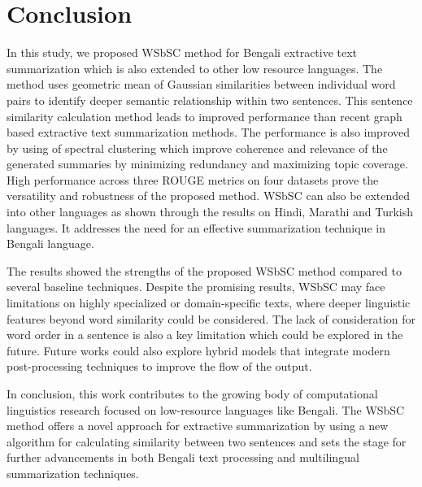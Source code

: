 \documentclass[acmlarge]{acmart}
\begin{document}
\section{Conclusion}\label{sec:conclusion}
In this study, we proposed WSbSC method for Bengali extractive text summarization which is also extended to other low resource languages. The method uses geometric mean of Gaussian similarities between individual word pairs to identify deeper semantic relationship within two sentences. This sentence similarity calculation method leads to improved performance than recent graph based extractive text summarization methods. The performance is also improved by using of spectral clustering which improve coherence and relevance of the generated summaries by minimizing redundancy and maximizing topic coverage. High performance across three ROUGE metrics on four datasets prove the versatility and robustness of the proposed method. WSbSC can also be extended into other languages as shown through the results on Hindi, Marathi and Turkish languages. 
It addresses the need for an effective summarization technique in Bengali language.

The results showed the strengths of the proposed WSbSC method compared to several baseline techniques. Despite the promising results, WSbSC may face limitations on highly specialized or domain-specific texts, where deeper linguistic features beyond word similarity could be considered. The lack of consideration for word order in a sentence is also a key limitation which could be explored in the future. Future works could also explore hybrid models that integrate modern post-processing techniques to improve the flow of the output.

In conclusion, this work contributes to the growing body of computational linguistics research focused on low-resource languages like Bengali. The WSbSC method offers a novel approach for extractive summarization by using a new algorithm for calculating similarity between two sentences and sets the stage for further advancements in both Bengali text processing and multilingual summarization techniques.




\appendix
\end{document}
